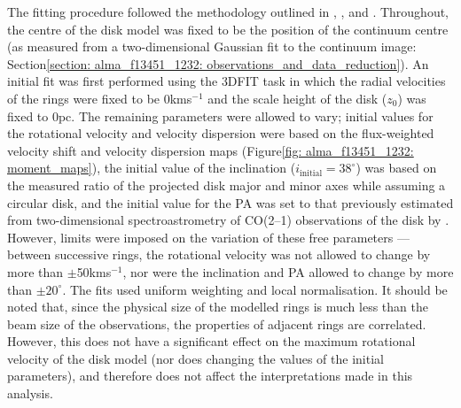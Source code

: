 The fitting procedure followed the methodology outlined in \citet{AlonsoHerrero2018}, \citet{DominguezFernandez2020}, and \citet{RamosAlmeida2022}. Throughout, the centre of the disk model was fixed to be the position of the continuum centre (as measured from a two-dimensional Gaussian fit to the continuum image: Section\;\ref{section: alma_f13451_1232: observations_and_data_reduction}). An initial fit was first performed using the \textsc{3DFIT} task in which the radial velocities of the rings were fixed to be 0\;km\;s$^{-1}$ and the scale height of the disk ($z_\mathrm{0}$) was fixed to 0\;pc. The remaining parameters were allowed to vary; initial values for the rotational velocity and velocity dispersion were based on the flux-weighted velocity shift and velocity dispersion maps (Figure\;\ref{fig: alma_f13451_1232: moment_maps}), the initial value of the inclination ($i_\mathrm{initial}=38^\circ$) was based on the measured ratio of the projected disk major and minor axes while assuming a circular disk, and the initial value for the PA was set to that previously estimated from two-dimensional spectroastrometry of CO(2--1) observations of the disk by \citet{Lamperti2022}. However, limits were imposed on the variation of these free parameters --- between successive rings, the rotational velocity was not allowed to change by more than $\pm$50\;km\;s$^{-1}$, nor were the inclination and PA allowed to change by more than $\pm20^\circ$. The fits used uniform weighting and local normalisation. It should be noted that, since the physical size of the modelled rings is much less than the beam size of the observations, the properties of adjacent rings are correlated. However, this does not have a significant effect on the maximum rotational velocity of the disk model (nor does changing the values of the initial parameters), and therefore does not affect the interpretations made in this analysis.

